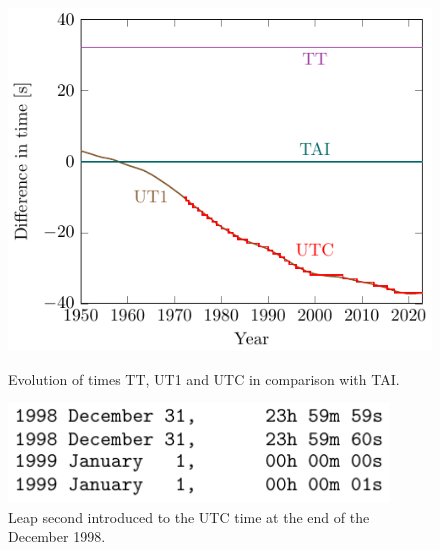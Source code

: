 \documentclass[../main.tex]{subfiles}
\begin{document}
\begin{figure}[htbp]
  \centering
  \begin{minipage}[ht]{0.45\textwidth}
    \centering
    \includegraphics[width=\textwidth]{Images/time_graph.pdf}
    \caption{Evolution of times TT, UT1 and UTC in comparison with TAI. \cite{iersDeltaT}}
    \label{fig:time_graph}
  \end{minipage}
  \hspace{0.0333333\textwidth}
  \begin{minipage}[ht]{0.45\textwidth}
    \centering
    \includegraphics[width=0.9\textwidth]{Images/leap_second.pdf}
    \caption{Leap second introduced to the UTC time at the end of the December 1998. \cite{iersbulletinC}}
    \label{fig:leapsecond}
  \end{minipage}
\end{figure}
\end{document}
